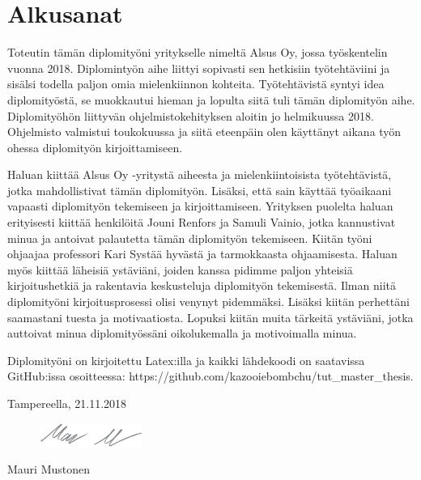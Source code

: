\chapter*{Alkusanat}
\label{ch:alkusanat}
Toteutin tämän diplomityöni yritykselle nimeltä Alsus Oy, jossa työskentelin vuonna 2018. Diplomintyön aihe liittyi sopivasti sen hetkisiin työtehtäviini ja sisälsi todella paljon omia mielenkiinnon kohteita. Työtehtävistä syntyi idea diplomityöstä, se muokkautui hieman ja lopulta siitä tuli tämän diplomityön aihe. Diplomityöhön liittyvän ohjelmistokehityksen aloitin jo helmikuussa 2018. Ohjelmisto valmistui toukokuussa ja siitä eteenpäin olen käyttänyt aikana työn ohessa diplomityön kirjoittamiseen.

Haluan kiittää Alsus Oy -yritystä aiheesta ja mielenkiintoisista työtehtävistä, jotka mahdollistivat tämän diplomityön. Lisäksi, että sain käyttää työaikaani vapaasti diplomityön tekemiseen ja kirjoittamiseen. Yrityksen puolelta haluan erityisesti kiittää henkilöitä Jouni Renfors ja Samuli Vainio, jotka kannustivat minua ja antoivat palautetta tämän diplomityön tekemiseen. Kiitän työni ohjaajaa professori Kari Systää hyvästä ja tarmokkaasta ohjaamisesta. Haluan myös kiittää läheisiä ystäviäni, joiden kanssa pidimme paljon yhteisiä kirjoitushetkiä ja rakentavia keskusteluja diplomityön tekemisestä. Ilman niitä diplomityöni kirjoitusprosessi olisi venynyt pidemmäksi. Lisäksi kiitän perhettäni saamastani tuesta ja motivaatiosta. Lopuksi kiitän muita tärkeitä ystäviäni, jotka auttoivat minua diplomityössäni oikolukemalla ja motivoimalla minua.

Diplomityöni on kirjoitettu Latex:illa ja kaikki lähdekoodi on saatavissa GitHub:issa osoitteessa: https://github.com/kazooiebombchu/tut\_master\_thesis.

\vspace{2\baselineskip}

Tampereella, 21.11.2018

\begin{figure}[ht!]
	\includegraphics[width=0.3\textwidth,left]{pictures/signature.png}
\end{figure}

Mauri Mustonen